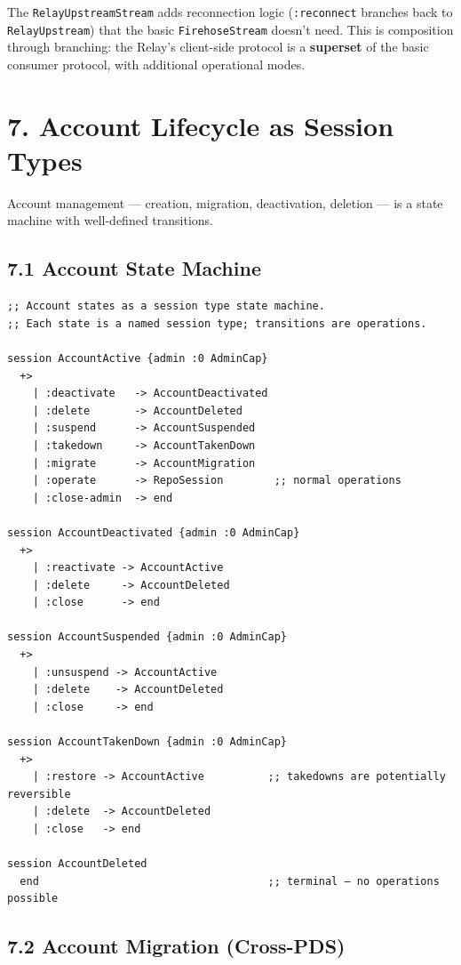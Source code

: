 \documentclass[11pt]{article}
\begin{document}
The \texttt{RelayUpstreamStream} adds reconnection logic (\texttt{:reconnect} branches
back to \texttt{RelayUpstream}) that the basic \texttt{FirehoseStream} doesn't need.
This is composition through branching: the Relay's client-side protocol is
a \textbf{superset} of the basic consumer protocol, with additional operational
modes.
\section{7. Account Lifecycle as Session Types}
\label{sec:org68441df}

Account management — creation, migration, deactivation, deletion — is a
state machine with well-defined transitions.
\subsection{7.1 Account State Machine}
\label{sec:org8073e48}

\begin{verbatim}
;; Account states as a session type state machine.
;; Each state is a named session type; transitions are operations.

session AccountActive {admin :0 AdminCap}
  +>
    | :deactivate   -> AccountDeactivated
    | :delete       -> AccountDeleted
    | :suspend      -> AccountSuspended
    | :takedown     -> AccountTakenDown
    | :migrate      -> AccountMigration
    | :operate      -> RepoSession        ;; normal operations
    | :close-admin  -> end

session AccountDeactivated {admin :0 AdminCap}
  +>
    | :reactivate -> AccountActive
    | :delete     -> AccountDeleted
    | :close      -> end

session AccountSuspended {admin :0 AdminCap}
  +>
    | :unsuspend -> AccountActive
    | :delete    -> AccountDeleted
    | :close     -> end

session AccountTakenDown {admin :0 AdminCap}
  +>
    | :restore -> AccountActive          ;; takedowns are potentially reversible
    | :delete  -> AccountDeleted
    | :close   -> end

session AccountDeleted
  end                                    ;; terminal — no operations possible
\end{verbatim}
\subsection{7.2 Account Migration (Cross-PDS)}
\label{sec:orgacfc7ae}
\end{document}
